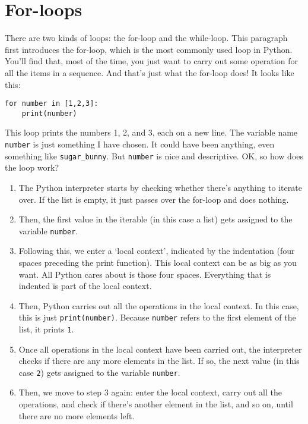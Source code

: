 \documentclass[12pt]{book}
\begin{document}
\section{For-loops}
There are two kinds of loops: the for-loop and the while-loop. This paragraph first introduces the for-loop, which is the most commonly used loop in Python. You'll find that, most of the time, you just want to carry out some operation for all the items in a sequence. And that's just what the for-loop does! It looks like this:

\begin{lstlisting}
for number in [1,2,3]:
    print(number)
\end{lstlisting}

This loop prints the numbers 1, 2, and 3, each on a new line. The variable name \texttt{number} is just something I have chosen. It could have been anything, even something like \texttt{sugar\_bunny}. But \texttt{number} is nice and descriptive. OK, so how does the loop work?

\begin{enumerate}
\item The Python interpreter starts by checking whether there's anything to iterate over. If the list is empty, it just passes over the for-loop and does nothing.

\item Then, the first value in the iterable (in this case a list) gets assigned to the variable \texttt{number}.

\item Following this, we enter a `local context', indicated by the indentation (four spaces preceding the print function). This local context can be as big as you want. All Python cares about is those four spaces. Everything that is indented is part of the local context.

\item Then, Python carries out all the operations in the local context. In this case, this is just \texttt{print(number)}. Because \texttt{number} refers to the first element of the list, it prints \texttt{1}.

\item Once all operations in the local context have been carried out, the interpreter checks if there are any more elements in the list. If so, the next value (in this case \texttt{2}) gets assigned to the variable
  \texttt{number}. 
  
\item Then, we move to step 3 again: enter the local context, carry out all the operations, and check if there's another element in the list, and so on, until there are no more elements left.
\end{enumerate}
\end{document}
